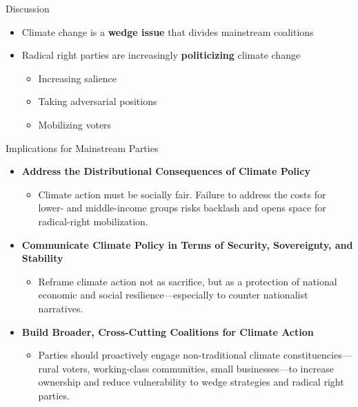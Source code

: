 \documentclass[
  ignorenonframetext,
]{beamer}
\providecommand{\tightlist}{%
  \setlength{\itemsep}{0pt}\setlength{\parskip}{0pt}}\usepackage{longtable,booktabs,array}
\begin{document}
\begin{frame}{Discussion}
\label{discussion}
\begin{itemize}[<+->]
\tightlist
\item
  Climate change is a \textbf{wedge issue} that divides mainstream
  coalitions
\item
  Radical right parties are increasingly \textbf{politicizing} climate
  change

  \begin{itemize}[<+->]
  \tightlist
  \item
    Increasing salience
  \item
    Taking adversarial positions
  \item
    Mobilizing voters
  \end{itemize}
\end{itemize}
\end{frame}

\begin{frame}{Implications for Mainstream Parties}
\label{implications-for-mainstream-parties}
\begin{itemize}[<+->]
\tightlist
\item
  \textbf{Address the Distributional Consequences of Climate Policy}

  \begin{itemize}[<+->]
  \tightlist
  \item
    Climate action must be socially fair. Failure to address the costs
    for lower- and middle-income groups risks backlash and opens space
    for radical-right mobilization.
  \end{itemize}
\item
  \textbf{Communicate Climate Policy in Terms of Security, Sovereignty,
  and Stability}

  \begin{itemize}[<+->]
  \tightlist
  \item
    Reframe climate action not as sacrifice, but as a protection of
    national economic and social resilience---especially to counter
    nationalist narratives.
  \end{itemize}
\item
  \textbf{Build Broader, Cross-Cutting Coalitions for Climate Action}

  \begin{itemize}[<+->]
  \tightlist
  \item
    Parties should proactively engage non-traditional climate
    constituencies---rural voters, working-class communities, small
    businesses---to increase ownership and reduce vulnerability to wedge
    strategies and radical right parties.
  \end{itemize}
\end{itemize}
\end{frame}
\end{document}
